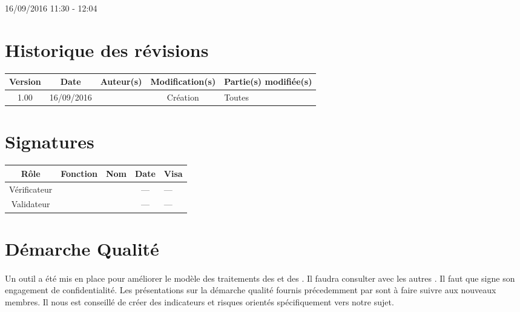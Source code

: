 \documentclass [a4paper] {article}
\begin{document}
\rhead{}

16/09/2016
\hfill   
\hfill 	11:30 - 12:04 				%



\section*{Historique des révisions}
\begin{center}
			\begin{tabular}{| c | c | c | c | p{4cm} |}
				\hline
				\rowcolor{Gray}
				Version & Date & Auteur(s) & Modification(s) & Partie(s) modifiée(s)		 \\
				\hline
				1.00 & 16/09/2016 & \Kafui & Création & Toutes \\
		\hline		
			\end{tabular}
		\end{center}

\section*{Signatures}

		\begin{center}
			\begin{tabular}{| c | c | c | c | p{4cm} |}
				\hline
				\rowcolor{Gray}
				Rôle & Fonction & Nom & Date & Visa		 \\
				\hline
				Vérificateur & \RGC & \Melissa & --- & --- \\[30pt]
				\hline
				Validateur & \CP & \Pierre & --- & --- \\[30pt]	
				\hline
			\end{tabular}
		\end{center}


\section{Démarche Qualité}
\paragraph*{}
Un outil a été mis en place pour améliorer le modèle des traitements des \FFT et des \FOC . Il faudra consulter avec les autres \RQ . Il faut que \Juliana signe son engagement de confidentialité. Les présentations sur la démarche qualité fournis précedemment par \nomTuteurQualite{} sont à faire suivre aux nouveaux membres. Il nous est conseillé de créer des indicateurs et risques orientés spécifiquement vers notre sujet. 
\end{document}
